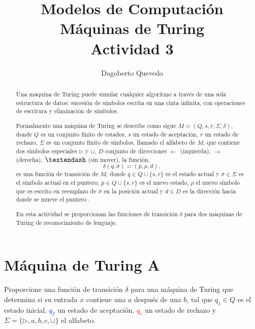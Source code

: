 \documentclass[letterpaper,11pt]{article}
\begin{document}
\title{Modelos de Computación\\\large Máquinas de Turing\\\large Actividad 3}
\author{Dagoberto Quevedo}
\maketitle

\begin{abstract}
Una máquina de Turing puede simular cualquier algoritmo a través de una sola estructura de datos: sucesión de símbolos escrita en una cinta infinita, con operaciones de escritura y eliminación de símbolos.

Formalmente una máquina de Turing se describe como sigue $M = (Q,s,r,\Sigma,\delta)$, donde $Q$ es un conjunto finito de estados, $s$ un estado de aceptación, $r$ un estado de rechazo, $\Sigma$ es un conjunto finito de símbolos, llamado el alfabeto de $M$, que contiene dos símbolos especiales $\rhd$ y $\sqcup$, $D$ conjunto de direcciones $\leftarrow$ (izquierda), $\rightarrow$ (derecha), $\textendash$ (sin mover), la función,
\begin{equation}
\delta(q,\sigma)=(p,\rho,d),
\end{equation}
es una función de transición de $M$, donde $q\in Q\cup\{s,r\}$ es el estado actual y $\sigma\in\Sigma$ es el símbolo actual en el puntero, $p\in Q\cup\{s,r\}$ es el nuevo estado, $\rho$ el nuevo símbolo que es escrito en reemplazo de $\sigma$ en la posición actual y $d\in D$ es la dirección hacia donde se mueve el puntero \cite{Schaeffer2020}.

En esta actividad se proporcionan las funciones de transición $\delta$ para dos máquinas de Turing de reconocimiento de lenguaje.

\end{abstract}


\section{Máquina de Turing A}
Proporcione una función de transición $\delta$ para una máquina de Turing que determina si su entrada $x$ contiene una $a$ después de una $b$, tal que $q_1\in Q$ es el estado inicial, \textcolor{blue}{$q_f$} un estado de aceptación, \textcolor{red}{$q_e$} un estado de rechazo y $\Sigma = \{\rhd,a,b,c,\sqcup\}$ el alfabeto.

\break
\end{document}
